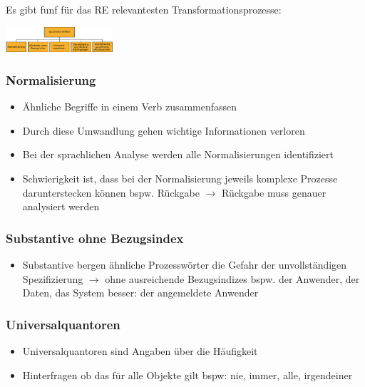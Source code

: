 \documentclass{report}
\newenvironment{Figure}
	{\par\medskip\noindent\minipage{\linewidth}}
	{\endminipage\par\medskip}
\theoremstyle{definition}
\theoremstyle{example}
\begin{document}
Es gibt funf für das RE relevantesten Transformationsprozesse:
\begin{Figure}
   \centering
    \includegraphics[width=150px]{img/5Transformationsprozesse.png}
        \label{fig:die wichtigsten Transformationsprozesse}
\end{Figure}

\subsubsection{Normalisierung}
\begin{itemize}
   \item Ähnliche Begriffe in einem Verb zusammenfassen
   \item Durch diese Umwandlung gehen wichtige Informationen verloren
   \item Bei der sprachlichen Analyse werden alle Normalisierungen identifiziert
   \item Schwierigkeit ist, dass bei der Normalisierung jeweils komplexe Prozesse darunterstecken können
   \subitem bspw. Rückgabe $\rightarrow$ Rückgabe muss genauer analysiert werden 
\end{itemize}

\subsubsection{Substantive ohne Bezugsindex}
\begin{itemize}
   \item Substantive bergen ähnliche Prozesswörter die Gefahr der unvollständigen Spezifizierung $\rightarrow$ ohne ausreichende Bezugsindizes
   \subitem bspw. der Anwender, der Daten, das System
   \subitem besser: der angemeldete Anwender 
\end{itemize}

\subsubsection{Universalquantoren}
\begin{itemize}
   \item Universalquantoren sind Angaben über die Häufigkeit
   \item Hinterfragen ob das für alle Objekte gilt
   \subitem bspw: nie, immer, alle, irgendeiner 
\end{itemize}
\end{document}
